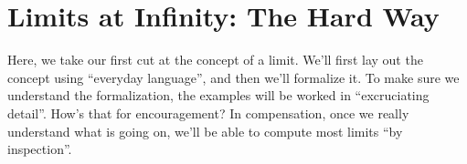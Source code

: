 











\section{Limits at Infinity: The Hard Way}
\label{sec:LimitInfinityHard}

Here, we take our first cut at the concept of a limit. We'll first lay out the concept using ``everyday language'', and then we'll formalize it. To make sure we understand the formalization, the examples will be worked in ``excruciating detail''. How's that for encouragement? In compensation, once we really understand what is going on, we'll be able to compute most limits ``by inspection''. 

